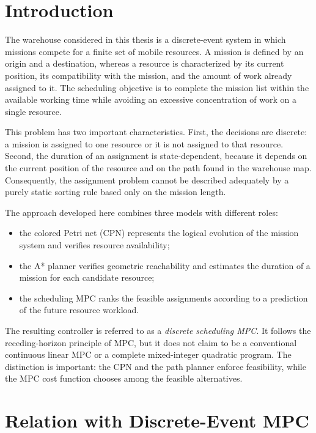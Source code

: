 
\section{Introduction}

The warehouse considered in this thesis is a discrete-event system in which
missions compete for a finite set of mobile resources. A mission is defined
by an origin and a destination, whereas a resource is characterized by its
current position, its compatibility with the mission, and the amount of work
already assigned to it. The scheduling objective is to complete the mission
list within the available working time while avoiding an excessive
concentration of work on a single resource.

This problem has two important characteristics. First, the decisions are
discrete: a mission is assigned to one resource or it is not assigned to that
resource. Second, the duration of an assignment is state-dependent, because
it depends on the current position of the resource and on the path found in
the warehouse map. Consequently, the assignment problem cannot be described
adequately by a purely static sorting rule based only on the mission length.

The approach developed here combines three models with different roles:
\begin{itemize}
	\item the colored Petri net (CPN) represents the logical evolution of the
	mission system and verifies resource availability;
	\item the A* planner verifies geometric reachability and estimates the
	duration of a mission for each candidate resource;
	\item the scheduling MPC ranks the feasible assignments according to a
	prediction of the future resource workload.
\end{itemize}

The resulting controller is referred to as a \emph{discrete scheduling MPC}.
It follows the receding-horizon principle of MPC, but it does not claim to be
a conventional continuous linear MPC or a complete mixed-integer quadratic
program. The distinction is important: the CPN and the path planner enforce
feasibility, while the MPC cost function chooses among the feasible
alternatives.

\section{Relation with Discrete-Event MPC}

